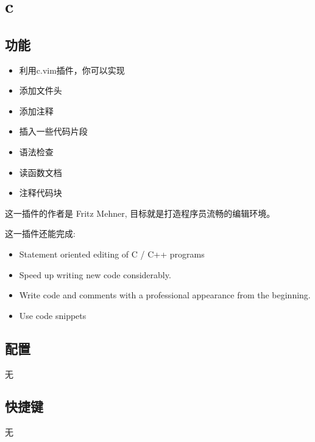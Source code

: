 \chapter{c}

\section{功能}
\begin{itemize}
    \item 利用c.vim插件，你可以实现
    \item 添加文件头 
    \item 添加注释 
    \item 插入一些代码片段 
    \item 语法检查 
    \item 读函数文档 
    \item 注释代码块
\end{itemize}
这一插件的作者是 Fritz Mehner, 目标就是打造程序员流畅的编辑环境。
 
这一插件还能完成:
\begin{itemize}
    \item Statement oriented editing of C / C++ programs
    \item Speed up writing new code considerably.
    \item Write code and comments with a professional appearance from the beginning.
    \item Use code snippets
\end{itemize}

\section{配置}
无

\section{快捷键}
无

\newpage
